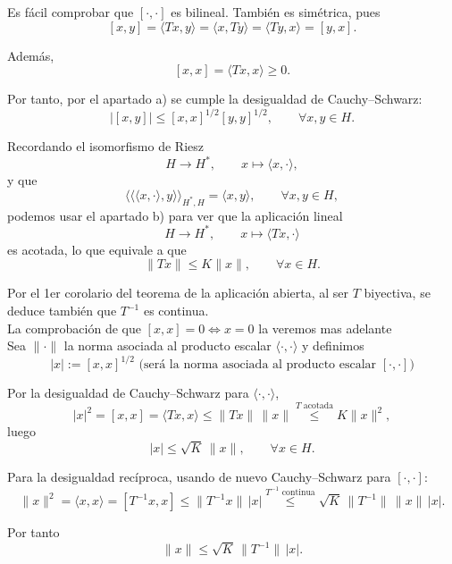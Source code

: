 \documentclass[12pt]{article}
\newcommand{\norma}[1]{\lVert #1 \rVert}
\begin{document}
\begin{ejercicio}[5 puntos]
    \noindent Es fácil comprobar que $[\cdot,\cdot]$ es bilineal.  
    También es simétrica, pues
    \[
    [x,y] = \langle Tx,y\rangle
    = \langle x,Ty\rangle
    = \langle Ty,x\rangle
    = [y,x].
    \]
    
    \noindent Además,
    \[
    [x,x] = \langle Tx,x\rangle \ge 0.
    \]
    
    \noindent Por tanto, por el apartado a) se cumple la desigualdad de Cauchy--Schwarz:
    \[
    |[x,y]| \le [x,x]^{1/2}[y,y]^{1/2},
    \qquad \forall x,y\in H.
    \]
    
    \noindent Recordando el isomorfismo de Riesz
    \[
    H \longrightarrow H^\ast,
    \qquad x \longmapsto \langle x,\cdot\rangle,
    \]
    y que
    \[
    \langle\!\langle \langle x,\cdot\rangle ,y\rangle\!\rangle_{H^\ast,H}
    = \langle x,y\rangle,
    \qquad \forall x,y\in H,
    \]
    podemos usar el apartado b) para ver que la aplicación lineal
    \[
    H \longrightarrow H^\ast,
    \qquad x \longmapsto \langle Tx,\cdot\rangle
    \]
    es acotada, lo que equivale a que
    \[
    \norma{Tx} \le K\norma{x},
    \qquad \forall x\in H.
    \]
    
    Por el 1er corolario del teorema de la aplicación abierta, al ser $T$ biyectiva,
    se deduce también que $T^{-1}$ es continua. \\

    La comprobación de que $[x,x]=0 \Longleftrightarrow x=0$ la veremos mas adelante\\
    
    Sea $\|\cdot\|$ la norma asociada al producto escalar $\langle\cdot,\cdot\rangle$
    y definimos
    \[
    |x| := [x,x]^{1/2} \text{ (será la norma asociada al producto escalar } [\cdot,\cdot])
    \]
    
    Por la desigualdad de Cauchy--Schwarz para $\langle\cdot,\cdot\rangle$,
    \[
    |x|^2 = [x,x] = \langle Tx,x\rangle
    \le \norma{Tx}\,\norma{x}
    \overset{T \text{ acotada}}{\le} K\norma{x}^2,
    \]
    luego
    \[
    |x| \le \sqrt{K}\,\norma{x},
    \qquad \forall x\in H.
    \]
    
    Para la desigualdad recíproca, usando de nuevo Cauchy--Schwarz para $[\cdot,\cdot]$:
    \[
    \norma{x}^2
    = \langle x,x\rangle
    = [T^{-1}x,x]
    \le \|T^{-1}x\|\,|x|
    \overset{T^{-1} \text{ continua}}{\le} \sqrt{K}\,\|T^{-1}\|\,\norma{x}\,|x|.
    \]
    
    Por tanto
    \[
    \norma{x}
    \le \sqrt{K}\,\|T^{-1}\|\,|x|.
    \]
    

\end{ejercicio}
\end{document}
